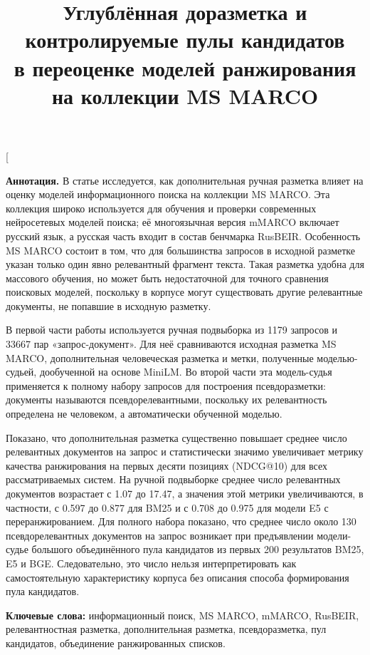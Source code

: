 \documentclass[10pt,a4paper,twocolumn]{article}
\title{\textbf{Углублённая доразметка и контролируемые пулы кандидатов}\\[0.25em]
\large в переоценке моделей ранжирования на коллекции MS MARCO}
\author{}
\date{}
\begin{document}
\twocolumn[
\begin{@twocolumnfalse}
\maketitle
\vspace{-1.2em}
\small
\noindent\textbf{Аннотация.} В статье исследуется, как дополнительная ручная разметка влияет на оценку моделей информационного поиска на коллекции MS MARCO. Эта коллекция широко используется для обучения и проверки современных нейросетевых моделей поиска; её многоязычная версия mMARCO включает русский язык, а русская часть входит в состав бенчмарка RusBEIR. Особенность MS MARCO состоит в том, что для большинства запросов в исходной разметке указан только один явно релевантный фрагмент текста. Такая разметка удобна для массового обучения, но может быть недостаточной для точного сравнения поисковых моделей, поскольку в корпусе могут существовать другие релевантные документы, не попавшие в исходную разметку.

В первой части работы используется ручная подвыборка из 1179 запросов и 33667 пар «запрос-документ». Для неё сравниваются исходная разметка MS MARCO, дополнительная человеческая разметка и метки, полученные моделью-судьей, дообученной на основе MiniLM. Во второй части эта модель-судья применяется к полному набору запросов для построения псевдоразметки: документы называются псевдорелевантными, поскольку их релевантность определена не человеком, а автоматически обученной моделью.

Показано, что дополнительная разметка существенно повышает среднее число релевантных документов на запрос и статистически значимо увеличивает метрику качества ранжирования на первых десяти позициях (NDCG@10) для всех рассматриваемых систем. На ручной подвыборке среднее число релевантных документов возрастает с 1.07 до 17.47, а значения этой метрики увеличиваются, в частности, с 0.597 до 0.877 для BM25 и с 0.708 до 0.975 для модели E5 с переранжированием. Для полного набора показано, что среднее число около 130 псевдорелевантных документов на запрос возникает при предъявлении модели-судье большого объединённого пула кандидатов из первых 200 результатов BM25, E5 и BGE. Следовательно, это число нельзя интерпретировать как самостоятельную характеристику корпуса без описания способа формирования пула кандидатов.

\medskip
\noindent\textbf{Ключевые слова:} информационный поиск, MS MARCO, mMARCO, RusBEIR, релевантностная разметка, дополнительная разметка, псевдоразметка, пул кандидатов, объединение ранжированных списков.


\end{@twocolumnfalse}
\end{document}
